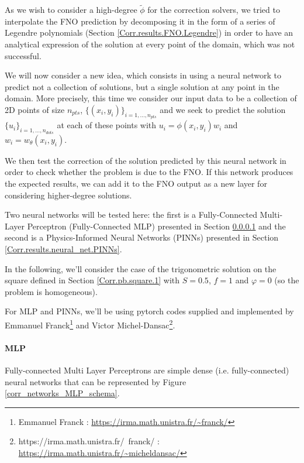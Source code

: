 As we wish to consider a high-degree $\tilde{\phi}$ for the correction solvers, we tried to interpolate the FNO prediction by decomposing it in the form of a series of Legendre polynomials (Section \ref{Corr.results.FNO.Legendre}) in order to have an analytical expression of the solution at every point of the domain, which was not successful.

We will now consider a new idea, which consists in using a neural network to predict not a collection of solutions, but a single solution at any point in the domain. More precisely, this time we consider our input data to be a collection of 2D points of size $n_{pts}$, $\{(x_i,y_i)\}_{i=1,\dots, n_{pts}}$ and we seek to predict the solution $\{u_i\}_{i=1,\dots,n_{dots}}$ at each of these points with $u_i=\phi(x_i,y_i)w_i$ and $w_i=w_\theta(x_i,y_i)$.

We then test the correction of the solution predicted by this neural network in order to check whether the problem is due to the FNO. If this network produces the expected results, we can add it to the FNO output as a new layer for considering higher-degree solutions.

Two neural networks will be tested here: the first is a Fully-Connected Multi-Layer Perceptron (Fully-Connected MLP) presented in Section \ref{Corr.results.neural_net.MLP} and the second is a Physics-Informed Neural Networks
(PINNs) presented in Section \ref{Corr.results.neural_net.PINNs}.

In the following, we'll consider the case of the trigonometric solution on the square defined in Section \ref{Corr.pb.square.1} with $S=0.5$, $f=1$ and $\varphi=0$ (so the problem is homogeneous).

\begin{Rem}
	For MLP and PINNs, we'll be using pytorch codes supplied and implemented by Emmanuel Franck\footnote{Emmanuel Franck : \url{https://irma.math.unistra.fr/~franck/}} and Victor Michel-Dansac\footnote{https://irma.math.unistra.fr/~franck/ : \url{https://irma.math.unistra.fr/~micheldansac/}}.
\end{Rem}

\paragraph{MLP} \label{Corr.results.neural_net.MLP}

Fully-connected Multi Layer Perceptrons are simple dense (i.e. fully-connected) neural networks that can be represented by Figure \ref{corr_networks_MLP_schema}. 

